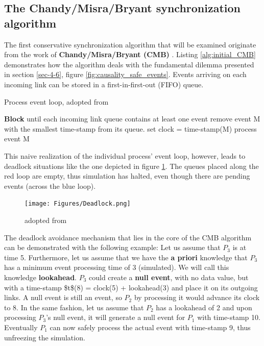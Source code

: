 \documentclass[12pt,twoside]{article}
\begin{document}
\subsection{The Chandy/Misra/Bryant synchronization algorithm}
\label{sec-5-1}
The first conservative synchronization algorithm that will be examined originate from the work of \textbf{Chandy/Misra/Bryant (CMB)} \cite{Bryant} \cite{Chandy1979}.
Listing \ref{alg:initial_CMB} demonstrates how the algorithm deals with the fundamental dilemma presented in section \ref{sec-4-6}, figure \ref{fig:causality_safe_events}.
Events arriving on each incoming link can be stored in a first-in-first-out (FIFO) queue.

\begin{algorithm}[H]
\caption{Process event loop, adopted from \cite{Fujimoto1999}}
\label{alg:initial_CMB}
\begin{algorithmic}[2]

      \State \textbf{Block} until each incoming link queue contains at least one event
      \State remove event M with the smallest time-stamp from its queue.
      \State set clock = time-stamp(M)
      \State process event M
   \EndWhile

\end{algorithmic}
\end{algorithm}

This naive realization of the individual process' event loop, however, leads to deadlock situations like the one depicted in figure \ref{fig:deadlock}.
The queues placed along the red loop are empty, thus simulation has halted, even though there are pending events (across the blue loop).

\begin{figure}[H]
\centering
\texttt{[image: Figures/Deadlock.png]}
\caption{\label{fig:deadlock}adopted from \cite{Fujimoto1999}}
\end{figure}

The deadlock avoidance mechanism that lies in the core of the CMB algorithm can be demonstrated with the following example:
Let us assume that $P_3$ is at time 5.
Furthermore, let us assume that we have the \textbf{a priori} knowledge that $P_3$ has a minimum event processing time of 3 (simulated).
We will call this knowledge \textbf{lookahead}.
$P_3$ could create a \textbf{null event}, with no data value, but with a time-stamp \$t\$(8) = clock(5) + lookahead(3) and place it on its outgoing links.
A null event is still an event, so $P_2$ by processing it would advance its clock to 8.
In the same fashion, let us assume that $P_2$ has a lookahead of 2 and upon processing $P_3$'s null event, 
it will generate a null event for $P_1$ with time-stamp 10. 
Eventually $P_1$ can now safely process the actual event with time-stamp 9, thus unfreezing the simulation.
\end{document}
